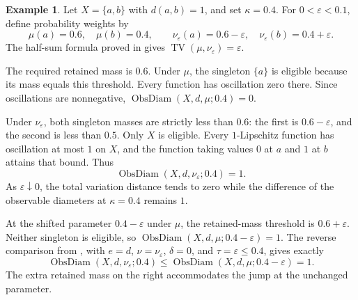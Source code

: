 \documentclass[a4paper,11pt]{article}
\theoremstyle{definition}
\newtheorem{example}[theorem]{Example}
\DeclareMathOperator{\ObsDiam}{ObsDiam}
\DeclareMathOperator{\TV}{TV}
\begin{document}
\begin{example}\label{ex:mass}
Let $X=\{a,b\}$ with $d(a,b)=1$, and set $\kappa=0.4$. For $0<\varepsilon<0.1$, define probability weights by
\[ \mu(a)=0.6,\quad\mu(b)=0.4,\qquad \nu_\varepsilon(a)=0.6-\varepsilon,\quad\nu_\varepsilon(b)=0.4+\varepsilon. \]
The half-sum formula proved in  gives $\TV(\mu,\nu_\varepsilon)=\varepsilon$.

The required retained mass is $0.6$. Under $\mu$, the singleton $\{a\}$ is eligible because its mass equals this threshold. Every function has oscillation zero there. Since oscillations are nonnegative, $\ObsDiam(X,d,\mu;0.4)=0$.

Under $\nu_\varepsilon$, both singleton masses are strictly less than $0.6$: the first is $0.6-\varepsilon$, and the second is less than $0.5$. Only $X$ is eligible. Every $1$-Lipschitz function has oscillation at most $1$ on $X$, and the function taking values $0$ at $a$ and $1$ at $b$ attains that bound. Thus
\[ \ObsDiam(X,d,\nu_\varepsilon;0.4)=1. \]
As $\varepsilon\downarrow0$, the total variation distance tends to zero while the difference of the observable diameters at $\kappa=0.4$ remains $1$.

At the shifted parameter $0.4-\varepsilon$ under $\mu$, the retained-mass threshold is $0.6+\varepsilon$. Neither singleton is eligible, so $\ObsDiam(X,d,\mu;0.4-\varepsilon)=1$. The reverse comparison from , with $e=d$, $\nu=\nu_\varepsilon$, $\delta=0$, and $\tau=\varepsilon\leq0.4$, gives exactly
\[ \ObsDiam(X,d,\nu_\varepsilon;0.4)\leq\ObsDiam(X,d,\mu;0.4-\varepsilon)=1. \]
The extra retained mass on the right accommodates the jump at the unchanged parameter.
\end{example}
\end{document}
